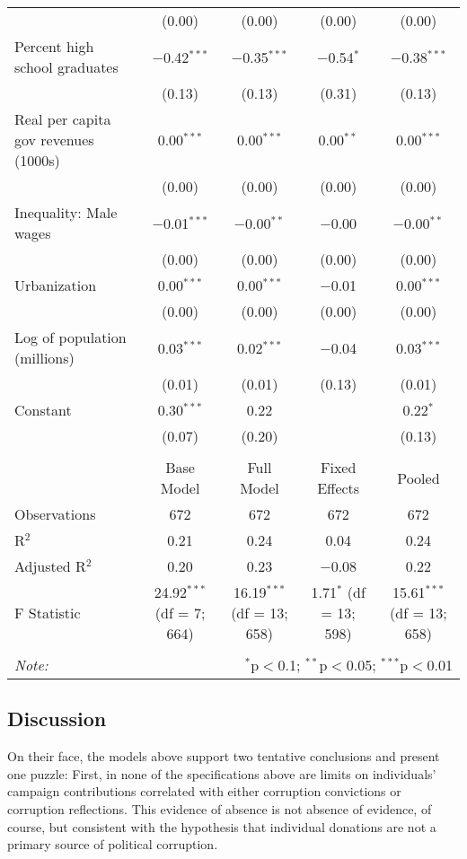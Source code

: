 \documentclass{jopsubmission}
\begin{document}
\begin{table}[!htbp]
{\begin{tabular}{@{\extracolsep{-15pt}}lcccc}
  & (0.00) & (0.00) & (0.00) & (0.00) \\ 
  Percent high school graduates & $-$0.42$^{***}$ & $-$0.35$^{***}$ & $-$0.54$^{*}$ & $-$0.38$^{***}$ \\ 
  & (0.13) & (0.13) & (0.31) & (0.13) \\ 
  Real per capita gov revenues (1000s) & 0.00$^{***}$ & 0.00$^{***}$ & 0.00$^{**}$ & 0.00$^{***}$ \\ 
  & (0.00) & (0.00) & (0.00) & (0.00) \\ 
  Inequality: Male wages & $-$0.01$^{***}$ & $-$0.00$^{**}$ & $-$0.00 & $-$0.00$^{**}$ \\ 
  & (0.00) & (0.00) & (0.00) & (0.00) \\ 
  Urbanization & 0.00$^{***}$ & 0.00$^{***}$ & $-$0.01 & 0.00$^{***}$ \\ 
  & (0.00) & (0.00) & (0.00) & (0.00) \\ 
  Log of population (millions) & 0.03$^{***}$ & 0.02$^{***}$ & $-$0.04 & 0.03$^{***}$ \\ 
  & (0.01) & (0.01) & (0.13) & (0.01) \\ 
  Constant & 0.30$^{***}$ & 0.22 &  & 0.22$^{*}$ \\ 
  & (0.07) & (0.20) &  & (0.13) \\ 
 \hline \\[-1.8ex] 
  & Base Model & Full Model & Fixed Effects & Pooled \\ 
Observations & 672 & 672 & 672 & 672 \\ 
R$^{2}$ & 0.21 & 0.24 & 0.04 & 0.24 \\ 
Adjusted R$^{2}$ & 0.20 & 0.23 & $-$0.08 & 0.22 \\ 
F Statistic & 24.92$^{***}$ (df = 7; 664) & 16.19$^{***}$ (df = 13; 658) & 1.71$^{*}$ (df = 13; 598) & 15.61$^{***}$ (df = 13; 658) \\ 
\hline 
\hline \\[-1.8ex] 
\textit{Note:}  & \multicolumn{4}{r}{$^{*}$p$<$0.1; $^{**}$p$<$0.05; $^{***}$p$<$0.01} \\ 
\end{tabular} 
}
\end{table}

\subsection{Discussion}\label{discussion}

On their face, the models above support two tentative conclusions and
present one puzzle: First, in none of the specifications above are
limits on individuals' campaign contributions correlated with either
corruption convictions or corruption reflections. This evidence of
absence is not absence of evidence, of course, but consistent with the
hypothesis that individual donations are not a primary source of
political corruption.
\end{document}
